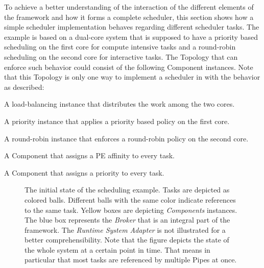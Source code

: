 To achieve a better understanding of the interaction of the different elements of the \cobas{} framework and how it forms a complete scheduler, this section shows how a simple \cobas{} scheduler implementation behaves regarding different scheduler tasks. The example is based on a dual-core system that is supposed to have a priority based scheduling on the first core for compute intensive tasks and a round-robin scheduling on the second core for interactive tasks. The \cobas{} Topology that can enforce such behavior could consist of the following Component instances. Note that this Topology is only one way to implement a scheduler in \cobas{} with the behavior as described:
\begin{itemize*}
	\item A load-balancing instance that distributes the work among the two cores.
	\item A priority instance that applies a priority based policy on the first core.
	\item A round-robin instance that enforces a round-robin policy on the second core.
	\item A Component that assigns a \ac{PE} affinity to every task.
	\item A Component that assigns a priority to every task.
\end{itemize*}

\begin{figure}[b!] \centering
	\caption[The initial state of the CoBaS scheduling example.]{The initial state of the \cobas{} scheduling example. Tasks are depicted as colored balls. Different balls with the same color indicate references to the same task. Yellow boxes are depicting \emph{Components} instances. The blue box represents the \emph{Broker} that is an integral part of the framework. The \emph{Runtime System Adapter} is not illustrated for a better comprehensibility. Note that the figure depicts the state of the whole system at a certain point in time. That means in particular that most tasks are referenced by multiple Pipes at once.}%
	\label{fig:arch:example:step0}
\end{figure}

